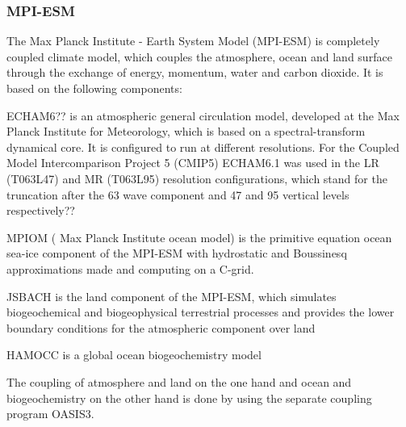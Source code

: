 \subsubsection{MPI-ESM}
The Max Planck Institute - Earth System Model (MPI-ESM) is completely coupled climate model, which  couples the atmosphere, ocean and land surface through the exchange of energy, momentum, water and carbon dioxide. It is based on the following components:
\begin{description}

	\item ECHAM6??
		 is an atmospheric general circulation model, developed at the Max Planck Institute for Meteorology, which is based on a spectral-transform dynamical core. It is configured to run at different resolutions. For the Coupled Model Intercomparison Project 5 (CMIP5) ECHAM6.1 was used in the LR (T063L47) and MR (T063L95) resolution configurations, which stand for the truncation after the 63 wave component and 47 and 95 vertical levels respectively??
	\item MPIOM ( Max Planck Institute ocean model) is the primitive equation ocean sea-ice component of the MPI-ESM with hydrostatic and Boussinesq approximations made and computing on a C-grid.
	\item JSBACH is the land component of the MPI-ESM, which simulates biogeochemical and biogeophysical terrestrial processes and provides the lower boundary conditions for the atmospheric component over land 
	\item HAMOCC is a global ocean biogeochemistry model
\end{description}

The coupling of atmosphere and land on the one hand and ocean and biogeochemistry on the other hand is done by using the separate coupling program OASIS3.